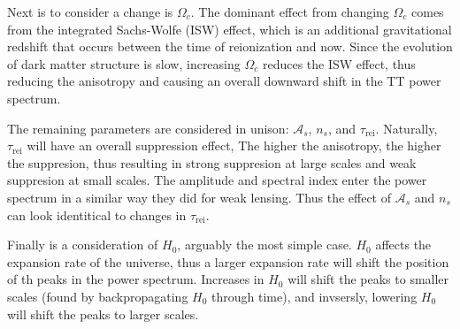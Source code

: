 Next is to consider a change is $\Omega_c$. The dominant effect from changing $\Omega_c$ comes from the integrated Sachs-Wolfe (ISW) effect, which is an additional gravitational redshift that occurs between the time of reionization and now. Since the evolution of dark matter structure is slow, increasing $\Omega_c$ reduces the ISW effect, thus reducing the anisotropy and causing an overall downward shift in the TT power spectrum.

The remaining parameters are considered in unison: $\mathcal{A}_s$, $n_s$, and $\tau_{\mathrm{rei}}$. Naturally, $\tau_{\mathrm{rei}}$ will have an overall suppression effect, The higher the anisotropy, the higher the suppresion, thus resulting in strong suppresion at large scales and weak suppresion at small scales. The amplitude and spectral index enter the power spectrum in a similar way they did for weak lensing. Thus the effect of $\mathcal{A}_s$ and $n_s$ can look identitical to changes in $\tau_\mathrm{rei}$.

Finally is a consideration of $H_0$, arguably the most simple case. $H_0$ affects the expansion rate of the universe, thus a larger expansion rate will shift the position of th peaks in the power spectrum. Increases in $H_0$ will shift the peaks to smaller scales (found by backpropagating $H_0$ through time), and invsersly, lowering $H_0$ will shift the peaks to larger scales.
